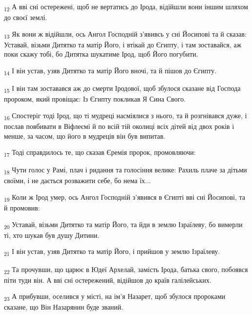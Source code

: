 \begin{tcolorbox}
\textsubscript{12} А вві сні остережені, щоб не вертатись до Ірода, відійшли вони іншим шляхом до своєї землі.
\end{tcolorbox}
\begin{tcolorbox}
\textsubscript{13} Як вони ж відійшли, ось Ангол Господній з'явивсь у сні Йосипові та й сказав: Уставай, візьми Дитятко та матір Його, і втікай до Єгипту, і там зоставайся, аж поки скажу тобі, бо Дитятка шукатиме Ірод, щоб Його погубити.
\end{tcolorbox}
\begin{tcolorbox}
\textsubscript{14} І він устав, узяв Дитятко та матір Його вночі, та й пішов до Єгипту.
\end{tcolorbox}
\begin{tcolorbox}
\textsubscript{15} І він там зоставався аж до смерти Іродової, щоб збулося сказане від Господа пророком, який провіщає: Із Єгипту покликав Я Сина Свого.
\end{tcolorbox}
\begin{tcolorbox}
\textsubscript{16} Спостеріг тоді Ірод, що ті мудреці насміялися з нього, та й розгнівався дуже, і послав повбивати в Віфлеємі й по всій тій околиці всіх дітей від двох років і менше, за часом, що його в мудреців він був випитав.
\end{tcolorbox}
\begin{tcolorbox}
\textsubscript{17} Тоді справдилось те, що сказав Єремія пророк, промовляючи:
\end{tcolorbox}
\begin{tcolorbox}
\textsubscript{18} Чути голос у Рамі, плач і ридання та голосіння велике: Рахиль плаче за дітьми своїми, і не дається розважити себе, бо нема їх...
\end{tcolorbox}
\begin{tcolorbox}
\textsubscript{19} Коли ж Ірод умер, ось Ангол Господній з'явився в Єгипті вві сні Йосипові, та й промовив:
\end{tcolorbox}
\begin{tcolorbox}
\textsubscript{20} Уставай, візьми Дитятко та матір Його, та йди в землю Ізраїлеву, бо вимерли ті, хто шукав був душу Дитини.
\end{tcolorbox}
\begin{tcolorbox}
\textsubscript{21} І він устав, узяв Дитятко та матір Його, і прийшов у землю Ізраїлеву.
\end{tcolorbox}
\begin{tcolorbox}
\textsubscript{22} Та прочувши, що царює в Юдеї Архелай, замість Ірода, батька свого, побоявся піти туди він. А вві сні остережений, відійшов до країв галілейських.
\end{tcolorbox}
\begin{tcolorbox}
\textsubscript{23} А прибувши, оселився у місті, на ім'я Назарет, щоб збулося пророками сказане, що Він Назарянин буде званий.
\end{tcolorbox}
